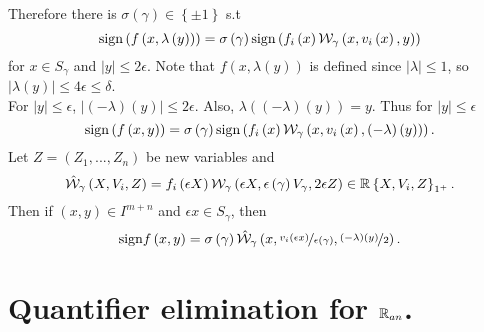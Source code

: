 Therefore there is $\sigma\left(\gamma\right)\in\left\{ \pm1\right\} $
s.t
\[
\mathrm{sign}\left(f\left(x,\lambda\left(y\right)\right)\right)=\sigma\left(\gamma\right)\mathrm{sign}\left(f_{i}\left(x\right)\mathcal{W}_{\gamma}\left(x,v_{i}\left(x\right),y\right)\right)
\]
for $x\in S_{\gamma}$ and $\left|y\right|\leq2\epsilon$. Note that
$f\left(x,\lambda\left(y\right)\right)$ is defined since $\left|\lambda\right|\leq1$,
so $\left|\lambda\left(y\right)\right|\leq4\epsilon\leq\delta$.\\
For $\left|y\right|\leq\epsilon$, $\left|\left(-\lambda\right)\left(y\right)\right|\leq2\epsilon$.
Also, $\lambda\left(\left(-\lambda\right)\left(y\right)\right)=y$.
Thus for $\left|y\right|\leq\epsilon$
\[
\mathrm{sign}\left(f\left(x,y\right)\right)=\sigma\left(\gamma\right)\mathrm{sign}\left(f_{i}\left(x\right)\mathcal{W}_{\gamma}\left(x,v_{i}\left(x\right),\left(-\lambda\right)\left(y\right)\right)\right).
\]
Let $Z=\left(Z_{1},...,Z_{n}\right)$ be new variables and 
\[
\hat{\mathcal{W}}_{\gamma}\left(X,V_{i},Z\right)=f_{i}\left(\epsilon X\right)\mathcal{W}_{\gamma}\left(\epsilon X,\epsilon\left(\gamma\right)V_{\gamma},2\epsilon Z\right)\in\mathbb{R}\left\{ X,V_{i},Z\right\} _{1^{+}}.
\]
Then if $\left(x,y\right)\in I^{m+n}$ and $\epsilon x\in S_{\gamma}$,
then 
\[
\mathrm{sign}f\left(x,y\right)=\sigma\left(\gamma\right)\hat{\mathcal{W}}_{\gamma}\left(x,\nicefrac{v_{i}\left(\epsilon x\right)}{\epsilon\left(\gamma\right)},\nicefrac{\left(-\lambda\right)\left(y\right)}{2}\right).
\]

\section{Quantifier elimination for $\mathbb{R}_{an}$.}

